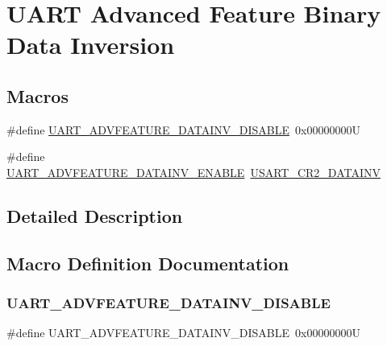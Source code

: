 \hypertarget{group___u_a_r_t___data___inv}{}\section{U\+A\+RT Advanced Feature Binary Data Inversion}
\label{group___u_a_r_t___data___inv}
\subsection*{Macros}
\begin{DoxyCompactItemize}
\item 
\#define \mbox{\hyperlink{group___u_a_r_t___data___inv_gab9aca2bdf257bd77e42213fdfdb884d3}{U\+A\+R\+T\+\_\+\+A\+D\+V\+F\+E\+A\+T\+U\+R\+E\+\_\+\+D\+A\+T\+A\+I\+N\+V\+\_\+\+D\+I\+S\+A\+B\+LE}}~0x00000000U
\item 
\#define \mbox{\hyperlink{group___u_a_r_t___data___inv_ga090ecbcdc57b47144aefee8faf1eaf23}{U\+A\+R\+T\+\_\+\+A\+D\+V\+F\+E\+A\+T\+U\+R\+E\+\_\+\+D\+A\+T\+A\+I\+N\+V\+\_\+\+E\+N\+A\+B\+LE}}~\mbox{\hyperlink{group___peripheral___registers___bits___definition_ga8f743bbd3df209bd1d434b17e08a78fe}{U\+S\+A\+R\+T\+\_\+\+C\+R2\+\_\+\+D\+A\+T\+A\+I\+NV}}
\end{DoxyCompactItemize}


\subsection{Detailed Description}


\subsection{Macro Definition Documentation}
\mbox{\label{group___u_a_r_t___data___inv_gab9aca2bdf257bd77e42213fdfdb884d3}} 
\subsubsection{\texorpdfstring{UART\_ADVFEATURE\_DATAINV\_DISABLE}{UART\_ADVFEATURE\_DATAINV\_DISABLE}}
{\footnotesize\ttfamily \#define U\+A\+R\+T\+\_\+\+A\+D\+V\+F\+E\+A\+T\+U\+R\+E\+\_\+\+D\+A\+T\+A\+I\+N\+V\+\_\+\+D\+I\+S\+A\+B\+LE~0x00000000U}

